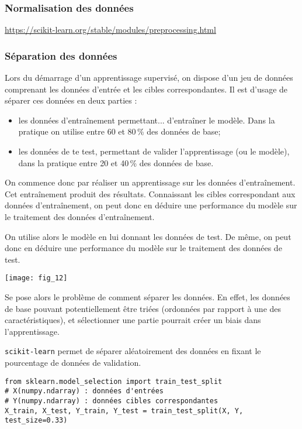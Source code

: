 \subsubsection{Normalisation des données}

\url{https://scikit-learn.org/stable/modules/preprocessing.html}

\subsubsection{Séparation des données}
{
Lors du démarrage d'un apprentissage supervisé, on dispose d'un jeu de données comprenant les données d'entrée et les cibles correspondantes. Il est d'usage de séparer ces données en deux parties :
\begin{itemize}
\item les données d’entraînement permettant... d’entraîner le modèle. Dans la pratique on utilise entre 60 et 80\,\% des données de base;
\item les données de te test, permettant de valider l'apprentissage (ou le modèle), dans la pratique entre 20 et 40\,\% des données de base.
\end{itemize}

On commence donc par réaliser un apprentissage sur les données d’entraînement. Cet entraînement produit des résultats. Connaissant les cibles correspondant aux données d'entraînement, on peut donc en déduire une performance du modèle sur le traitement des données d’entraînement. 

On utilise alors le modèle en lui donnant les données de test. De même, on peut donc en déduire une performance du modèle sur le traitement des données de test.  

\begin{center}
\texttt{[image: fig\_12]}
\end{center}

 Se pose alors le problème de comment séparer les données. En effet, les données de base pouvant potentiellement être triées (ordonnées par rapport à une des caractéristiques), et sélectionner une partie pourrait créer un biais dans l'apprentissage. 

\texttt{scikit-learn} permet de séparer aléatoirement des données en fixant le pourcentage de données de validation.


\begin{lstlisting}
from sklearn.model_selection import train_test_split
# X(numpy.ndarray) : données d'entrées
# Y(numpy.ndarray) : données cibles correspondantes
X_train, X_test, Y_train, Y_test = train_test_split(X, Y, test_size=0.33)
\end{lstlisting}


}
